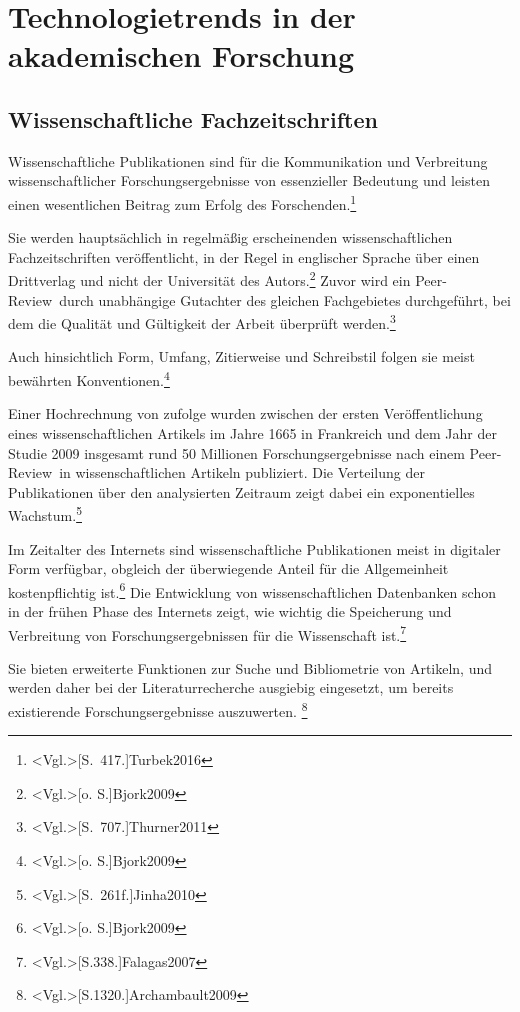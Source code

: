 \section{Technologietrends in der akademischen Forschung}
\subsection{Wissenschaftliche Fachzeitschriften}
Wissenschaftliche Publikationen sind für die Kommunikation und Verbreitung wissenschaftlicher Forschungsergebnisse von essenzieller Bedeutung und leisten einen wesentlichen Beitrag zum Erfolg des Forschenden.\footnote{\citeNP<Vgl.>[S.~417.]{Turbek2016}}

Sie werden hauptsächlich in regelmäßig erscheinenden wissenschaftlichen Fachzeitschriften veröffentlicht, in der Regel in englischer Sprache über einen Drittverlag und nicht der Universität des Autors.\footnote{\citeNP<Vgl.>[o. S.]{Bjork2009}} Zuvor wird ein \glqq Peer-Review\grqq~durch unabhängige Gutachter des gleichen Fachgebietes durchgeführt, bei dem die Qualität und Gültigkeit der Arbeit überprüft werden.\footnote{\citeNP<Vgl.>[S.~707.]{Thurner2011}}

Auch hinsichtlich Form, Umfang, Zitierweise und Schreibstil folgen sie meist bewährten Konventionen.\footnote{\citeNP<Vgl.>[o. S.]{Bjork2009}}

Einer Hochrechnung von  zufolge wurden zwischen der ersten Veröffentlichung eines wissenschaftlichen Artikels im Jahre 1665 in Frankreich und dem Jahr der Studie 2009 insgesamt rund 50 Millionen Forschungsergebnisse nach einem \glqq Peer-Review\grqq~in wissenschaftlichen Artikeln publiziert. Die Verteilung der Publikationen über den analysierten Zeitraum zeigt dabei ein exponentielles Wachstum.\footnote{\citeNP<Vgl.>[S.~261f.]{Jinha2010}}

Im Zeitalter des Internets sind wissenschaftliche Publikationen meist in digitaler Form verfügbar, obgleich der überwiegende Anteil für die Allgemeinheit kostenpflichtig ist.\footnote{\citeNP<Vgl.>[o. S.]{Bjork2009}} Die Entwicklung von wissenschaftlichen Datenbanken schon in der frühen Phase des Internets zeigt, wie wichtig die Speicherung und Verbreitung von Forschungsergebnissen für die Wissenschaft ist.\footnote{\citeNP<Vgl.>[S.338.]{Falagas2007}}

Sie bieten erweiterte Funktionen zur Suche und Bibliometrie von Artikeln, und werden daher bei der Literaturrecherche ausgiebig eingesetzt, um bereits existierende Forschungsergebnisse auszuwerten. \footnote{\citeNP<Vgl.>[S.1320.]{Archambault2009}}

